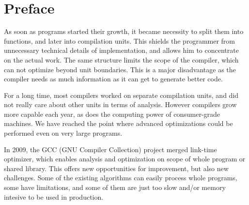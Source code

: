 \chapter*{Preface}

%
%
%
%

As soon as programs started their growth, it became necessity to split them into
functions, and later into compilation units. This shields the programmer from
unnecessary technical details of implementation, and allows him to concentrate on
the actual work. The same structure limits the scope of the compiler, which can not
optimize beyond unit boundaries.  This is a major disadvantage as the compiler
needs as much information as it can get to generate better code.

For a long time, most compilers worked on separate compilation units, and did not
really care about other units in terms of analysis.  However  compilers grow
more capable each year, as does the computing power of consumer-grade machines.
We have reached the point where advanced optimizations could be performed even
on very large programs.

In 2009, the GCC (GNU Compiler Collection) project merged link-time optimizer, which enables
analysis and optimization on scope of whole program or shared library. This offers new
opportunities for improvement, but also new challenges. Some of the existing
algorithms can easily process whole programs, some have limitations, and some
of them are just too slow and/or memory intesive to be used in production.

